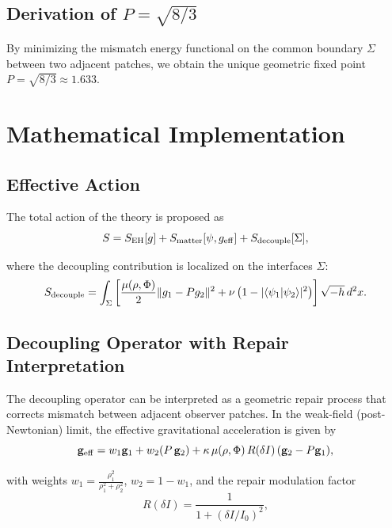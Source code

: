 \documentclass[12pt,a4paper]{article}
\begin{document}
\subsection{Derivation of \(P = \sqrt{8/3}\)}

By minimizing the mismatch energy functional on the common boundary \(\Sigma\) between two adjacent patches, we obtain the unique geometric fixed point \(P = \sqrt{8/3} \approx 1.633\).

\section{Mathematical Implementation}

\subsection{Effective Action}

The total action of the theory is proposed as
\begin{equation}
S = S_{\rm EH}[g] + S_{\rm matter}[\psi, g_{\rm eff}] + S_{\rm decouple}[\Sigma],
\end{equation}

where the decoupling contribution is localized on the interfaces $\Sigma$:
\begin{equation}
S_{\rm decouple} = \int_{\Sigma} \left[ \frac{\mu(\rho,\Phi)}{2} \| g_1 - P g_2 \|^2 + \nu \left(1 - |\langle \psi_1 | \psi_2 \rangle|^2 \right) \right] \sqrt{-h} \, d^2x.
\end{equation}

\subsection{Decoupling Operator with Repair Interpretation}

The decoupling operator can be interpreted as a geometric repair process that corrects mismatch between adjacent observer patches. In the weak-field (post-Newtonian) limit, the effective gravitational acceleration is given by
\begin{equation}
\mathbf{g}_{\rm eff} = w_1 \mathbf{g}_1 + w_2 (P \, \mathbf{g}_2) + \kappa \, \mu(\rho, \Phi) \, R(\delta I) \, (\mathbf{g}_2 - P \mathbf{g}_1),
\end{equation}

with weights \( w_1 = \frac{\rho_1^2}{\rho_1^2 + \rho_2^2} \), \( w_2 = 1 - w_1 \), and the repair modulation factor
\begin{equation}
R(\delta I) = \frac{1}{1 + (\delta I / I_0)^2},
\end{equation}
\end{document}
